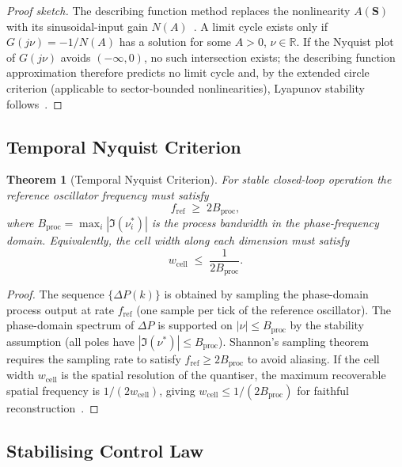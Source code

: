 \documentclass[10pt,twocolumn]{article}
\theoremstyle{plain}
\newtheorem{theorem}{Theorem}[section]
\theoremstyle{definition}
\theoremstyle{remark}
\newcommand{\R}{\mathbb{R}}
\newcommand{\DeltaP}{\Delta P}
\newcommand{\fref}{f_{\mathrm{ref}}}
\newcommand{\Bproc}{B_{\mathrm{proc}}}
\begin{document}
\begin{proof}[Proof sketch]
The describing function method replaces the nonlinearity $A(\mathbf{S})$
with its sinusoidal-input gain $N(A)$~\cite{Khalil2002}.  A limit cycle
exists only if $G(j\nu) = -1/N(A)$ has a solution for some $A > 0$,
$\nu \in \R$.  If the Nyquist plot of $G(j\nu)$ avoids $(-\infty,0)$,
no such intersection exists; the describing function approximation
therefore predicts no limit cycle and, by the extended circle criterion
(applicable to sector-bounded nonlinearities), Lyapunov stability
follows~\cite{Khalil2002}.
\end{proof}

\subsection{Temporal Nyquist Criterion}
\label{ssec:nyquist}

\begin{theorem}[Temporal Nyquist Criterion]
\label{thm:nyquist}
For stable closed-loop operation the reference oscillator frequency
must satisfy
\begin{equation}
  \fref \;\geq\; 2\Bproc,
  \label{eq:nyquist}
\end{equation}
where $\Bproc = \max_i |\Im(\nu_i^*)|$ is the process bandwidth in the
phase-frequency domain.  Equivalently, the cell width along each
dimension must satisfy
\begin{equation}
  w_{\mathrm{cell}} \;\leq\; \frac{1}{2\Bproc}.
  \label{eq:cellwidth}
\end{equation}
\end{theorem}

\begin{proof}
The sequence $\{\DeltaP(k)\}$ is obtained by sampling the
phase-domain process output at rate $\fref$ (one sample per tick of the
reference oscillator).  The phase-domain spectrum of $\DeltaP$ is
supported on $|\nu| \leq \Bproc$ by the stability assumption (all poles
have $|\Im(\nu^*)| \leq \Bproc$).  Shannon's sampling theorem
\cite{Shannon1948} requires the sampling rate to satisfy
$\fref \geq 2\Bproc$ to avoid aliasing.  If the cell width $w_{\mathrm{cell}}$
is the spatial resolution of the quantiser, the maximum recoverable
spatial frequency is $1/(2w_{\mathrm{cell}})$, giving
$w_{\mathrm{cell}} \leq 1/(2\Bproc)$ for faithful reconstruction~\cite{Astrom1997}.
\end{proof}

\subsection{Stabilising Control Law}
\label{ssec:control}
\end{document}
